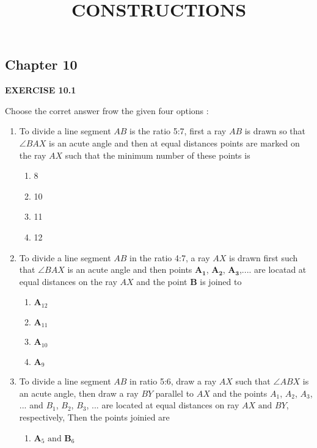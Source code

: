 \documentclass[12pt]{article}
\let\vec\mathbf
\begin{document}
\begin{center}
\enlargethispage{-4cm}
\title{\textbf{CONSTRUCTIONS}}
\date{\vspace{-5ex}} %
\maketitle
\end{center}
\setcounter{page}{1}
\begin{center}
\section*{Chapter 10}
\textbf{EXERCISE 10.1}
\end{center}
\fi
Choose the corret answer frow the given four options :
\begin{enumerate}
\item To divide a line segment $AB$ is the ratio 5:7, first a ray $AB$ is drawn so that $\angle{BAX}$ is an acute angle and then at equal distances points are marked on the ray $AX$ such that the minimum number of these points is 
\begin{enumerate}
\item 8
\item 10
\item 11
\item 12
\end{enumerate}
\item To divide a line segment $AB$ in the ratio 4:7, a ray $AX$ is drawn first such that $\angle{BAX}$ is an acute angle and then points $\vec{A_1}$, $\vec{A_2}$, $\vec{A_3}$,.... are locatad at equal distances on the ray $AX$ and the point $\vec{B}$ is joined to 
\begin{enumerate}
	\item $\vec{A}_{12}$
	\item $\vec{A}_{11}$
	\item $\vec{A}_{10}$
	\item $\vec{A}_9$
\end{enumerate}
\item To divide a line segment $AB$ in ratio 5:6, draw a ray $AX$ such that $\angle{ABX}$ is an acute angle, then draw a ray $BY$ parallel to $AX$ and the points $A_1$, $A_2$, $A_3$, ... and $B_1$, $B_2$, $B_3$, ... are located at equal distances on ray $AX\text{ and }BY$, respectively, Then the points joinied are 
\begin{enumerate}
\item $\vec{A}_5\text{ and }\vec{B}_6$

\end{enumerate}
\end{enumerate}
\end{document}
